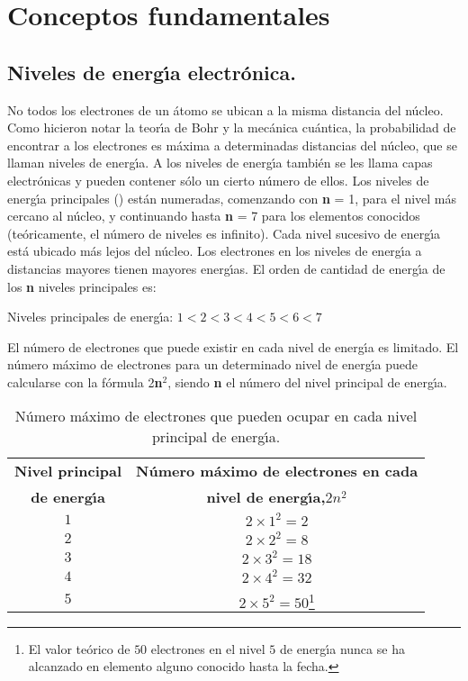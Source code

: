 \section{Conceptos fundamentales}
\subsection{Niveles de energ\'{\i}a electr\'onica.}
No todos los electrones de un \'atomo se ubican a la misma distancia del n\'ucleo. Como hicieron notar la teor\'{\i}a de Bohr y la mec\'anica cu\'antica, la pro\-babilidad de encontrar a los electrones es m\'axima a determinadas distancias del n\'ucleo, que se llaman niveles de energ\'{\i}a. A los niveles de energ\'{\i}a tambi\'en se les llama capas electr\'onicas y pueden contener s\'olo un cierto n\'umero de ellos. Los niveles de energ\'{\i}a principales (\textbf{}) est\'an numeradas, comenzando con \textbf{n} = 1, para el nivel m\'as cercano al n\'ucleo, y continuando hasta  \textbf{n} = 7 para los elementos conocidos  (te\'oricamente, el n\'umero de niveles es infinito). Cada nivel sucesivo de energ\'{\i}a est\'a ubicado m\'as lejos del n\'ucleo. Los electrones en los niveles de energ\'{\i}a a distancias mayores tienen mayores energ\'{\i}as. El orden de cantidad de energ\'{\i}a de los \textbf{n}  niveles principales es: 

Niveles principales de energ\'{\i}a: $1< 2 < 3 < 4 < 5 < 6< 7$

El n\'umero de electrones que puede existir en cada nivel de energ\'{\i}a es limitado. El n\'umero m\'aximo de electrones para un determinado nivel de energ\'{\i}a puede calcularse con la f\'ormula 2\textbf{n}$^2$, siendo \textbf{n} el n\'umero del nivel principal de  energ\'{\i}a.

\begin{table}[hbt]
\caption[Electrones en el nivel principal de energ\'{\i}a]{N\'umero m\'aximo de
electrones que pueden ocupar en cada nivel principal de energ\'{\i}a.}
\label{tab1.cap3}
\begin{minipage}{\linewidth}
\begin{center}
\begin{tabular}{ cc }\hline
\textbf{Nivel principal} &\textbf{N\'umero m\'aximo de electrones en cada}\\
\textbf{de energ\'{\i}a}& \textbf{nivel de energ\'{\i}a,}$2n^2$\\ \hline
$1$&$2\times 1^2 = 2$\\
$2$&$2\times 2^2 = 8$\\
$3$&$2\times 3^2 = 18$\\
$4$&$2\times 4^2 = 32$\\
$5$&$2\times 5^2 = 50$\footnote{El valor te\'orico de $50$ electrones en el
nivel $5$ de energ\'{\i}a nunca se  ha alcanzado en elemento alguno conocido hasta la
fecha.}\\ \hline 
\end{tabular}
\end{center}
\end{minipage}
\end{table}


